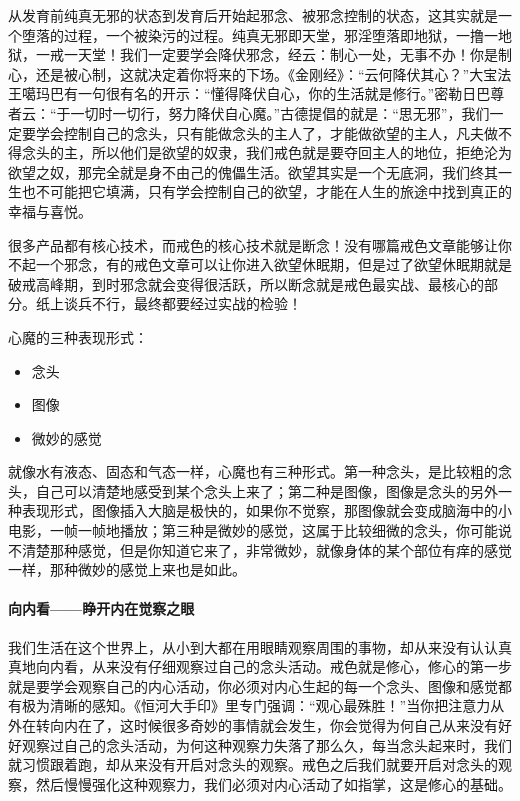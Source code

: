 从发育前纯真无邪的状态到发育后开始起邪念、被邪念控制的状态，这其实就是一个堕落的过程，一个被染污的过程。纯真无邪即天堂，邪淫堕落即地狱，一撸一地狱，一戒一天堂！我们一定要学会降伏邪念，经云：制心一处，无事不办！你是制心，还是被心制，这就决定着你将来的下场。《金刚经》：“云何降伏其心？”大宝法王噶玛巴有一句很有名的开示：“懂得降伏自心，你的生活就是修行。”密勒日巴尊者云：“于一切时一切行，努力降伏自心魔。”古德提倡的就是：“思无邪”，我们一定要学会控制自己的念头，只有能做念头的主人了，才能做欲望的主人，凡夫做不得念头的主，所以他们是欲望的奴隶，我们戒色就是要夺回主人的地位，拒绝沦为欲望之奴，那完全就是身不由己的傀儡生活。欲望其实是一个无底洞，我们终其一生也不可能把它填满，只有学会控制自己的欲望，才能在人生的旅途中找到真正的幸福与喜悦。

很多产品都有核心技术，而戒色的核心技术就是断念！没有哪篇戒色文章能够让你不起一个邪念，有的戒色文章可以让你进入欲望休眠期，但是过了欲望休眠期就是破戒高峰期，到时邪念就会变得很活跃，所以断念就是戒色最实战、最核心的部分。纸上谈兵不行，最终都要经过实战的检验！

心魔的三种表现形式：

\begin{multicols}{3}
    \begin{itemize}
        \item 念头
        \item 图像
        \item 微妙的感觉
    \end{itemize}
\end{multicols}

就像水有液态、固态和气态一样，心魔也有三种形式。第一种念头，是比较粗的念头，自己可以清楚地感受到某个念头上来了；第二种是图像，图像是念头的另外一种表现形式，图像插入大脑是极快的，如果你不觉察，那图像就会变成脑海中的小电影，一帧一帧地播放；第三种是微妙的感觉，这属于比较细微的念头，你可能说不清楚那种感觉，但是你知道它来了，非常微妙，就像身体的某个部位有痒的感觉一样，那种微妙的感觉上来也是如此。

\paragraph{向内看——睁开内在觉察之眼}

我们生活在这个世界上，从小到大都在用眼睛观察周围的事物，却从来没有认认真真地向内看，从来没有仔细观察过自己的念头活动。戒色就是修心，修心的第一步就是要学会观察自己的内心活动，你必须对内心生起的每一个念头、图像和感觉都有极为清晰的感知。《恒河大手印》里专门强调：“观心最殊胜！”当你把注意力从外在转向内在了，这时候很多奇妙的事情就会发生，你会觉得为何自己从来没有好好观察过自己的念头活动，为何这种观察力失落了那么久，每当念头起来时，我们就习惯跟着跑，却从来没有开启对念头的观察。戒色之后我们就要开启对念头的观察，然后慢慢强化这种观察力，我们必须对内心活动了如指掌，这是修心的基础。

